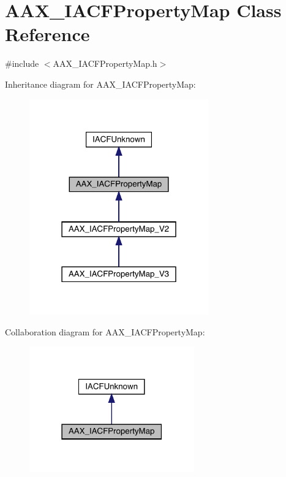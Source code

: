 \hypertarget{a01745}{}\section{A\+A\+X\+\_\+\+I\+A\+C\+F\+Property\+Map Class Reference}
\label{a01745}


{\ttfamily \#include $<$A\+A\+X\+\_\+\+I\+A\+C\+F\+Property\+Map.\+h$>$}



Inheritance diagram for A\+A\+X\+\_\+\+I\+A\+C\+F\+Property\+Map\+:
\nopagebreak
\begin{figure}[H]
\begin{center}
\leavevmode
\includegraphics[width=219pt]{a01744}
\end{center}
\end{figure}


Collaboration diagram for A\+A\+X\+\_\+\+I\+A\+C\+F\+Property\+Map\+:
\nopagebreak
\begin{figure}[H]
\begin{center}
\leavevmode
\includegraphics[width=202pt]{a01743}
\end{center}
\end{figure}


